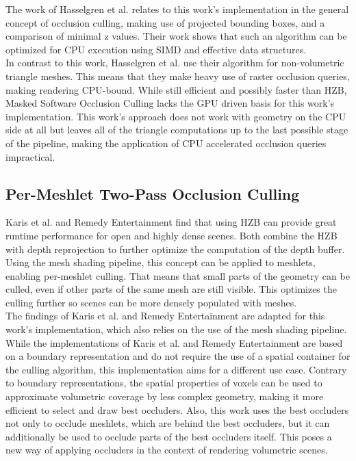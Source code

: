 \noindent
The work of Hasselgren et al. relates to this work's implementation in the general concept of occlusion culling, making 
use of projected bounding boxes, and a comparison of minimal z values. Their work shows that such an algorithm can be 
optimized for \ac{CPU} execution using \ac{SIMD} and effective data structures. \\

\noindent 
In contrast to this work, Hasselgren et al. use their algorithm for non-volumetric triangle meshes. This means that 
they make heavy use of raster occlusion queries, making rendering CPU-bound. While still efficient and possibly faster 
than \ac{HZB}, Masked Software Occlusion Culling lacks the \ac{GPU} driven basis for this work's implementation. This 
work's approach does not work with geometry on the \ac{CPU} side at all but leaves all of the triangle computations up 
to the last possible stage of the pipeline, making the application of \ac{CPU} accelerated occlusion queries impractical.


\subsection*{Per-Meshlet Two-Pass Occlusion Culling}

Karis et al. \cite{Karis2021} and Remedy Entertainment \cite{Remedy2023} find that using \ac{HZB} can provide great 
runtime performance for open and highly dense scenes. Both combine the \ac{HZB} with depth reprojection to further optimize 
the computation of the depth buffer. Using the mesh shading pipeline, this concept can be applied to meshlets, enabling 
per-meshlet culling. That means that small parts of the geometry can be culled, even if other parts of the same mesh are 
still visible. This optimizes the culling further so scenes can be more densely populated with meshes. \\

\noindent
The findings of Karis et al. and Remedy Entertainment are adapted for this work's implementation, which also relies on 
the use of the mesh shading pipeline. While the implementations of Karis et al. and Remedy Entertainment are based on 
a boundary representation and do not require the use of a spatial container for the culling algorithm, this 
implementation aims for a different use case. Contrary to boundary representations, the spatial properties of voxels 
can be used to approximate volumetric coverage by less complex geometry, making it more efficient to select and draw 
best occluders. Also, this work uses the best occluders not only to occlude meshlets, which are behind the best occluders, 
but it can additionally be used to occlude parts of the best occluders itself. This poses a new way of applying occluders 
in the context of rendering volumetric scenes.

